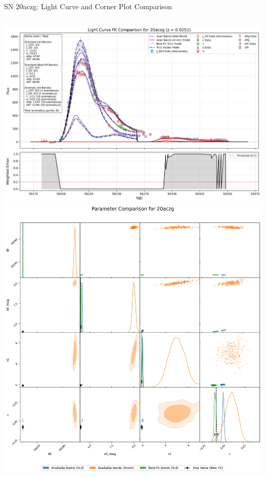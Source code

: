\documentclass[aspectratio=169]{beamer}
\begin{document}
\begin{frame}{SN 20aczg: Light Curve and Corner Plot Comparison}
  \begin{columns}
    \includegraphics[width=1\textwidth]{images/light_curve_comparison_20aczg.png}
    \includegraphics[width=1\textwidth]{images/corner_comparison_20aczg.png}
  \end{columns}
\end{frame}
\end{document}
